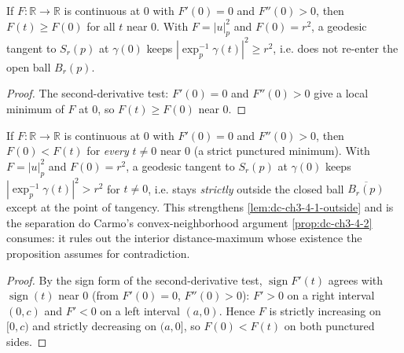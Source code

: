 \begin{lemma}
  \label{lem:dc-ch3-4-1-outside}
  \leanok
  If $F:\mathbb{R}\to\mathbb{R}$ is continuous at $0$ with $F'(0)=0$ and
  $F''(0)>0$, then $F(t)\ge F(0)$ for all $t$ near $0$. With $F=|u|_p^2$ and
  $F(0)=r^2$, a geodesic tangent to $S_r(p)$ at $\gamma(0)$ keeps
  $|\exp_p^{-1}\gamma(t)|^2\ge r^2$, i.e. does not re-enter the open ball
  $B_r(p)$.
\end{lemma}
\begin{proof}
  \leanok
  The second-derivative test: $F'(0)=0$ and $F''(0)>0$ give a local minimum of
  $F$ at $0$, so $F(t)\ge F(0)$ near $0$.
\end{proof}

\begin{lemma}
  \label{lem:dc-ch3-4-1-strict-outside}
  \leanok
  If $F:\mathbb{R}\to\mathbb{R}$ is continuous at $0$ with $F'(0)=0$ and
  $F''(0)>0$, then $F(0)<F(t)$ for \emph{every} $t\neq0$ near $0$ (a strict
  punctured minimum). With $F=|u|_p^2$ and $F(0)=r^2$, a geodesic tangent to
  $S_r(p)$ at $\gamma(0)$ keeps $|\exp_p^{-1}\gamma(t)|^2>r^2$ for $t\neq0$, i.e.
  stays \emph{strictly} outside the closed ball $\overline{B_r(p)}$ except at the
  point of tangency. This strengthens \cref{lem:dc-ch3-4-1-outside} and is the
  separation do Carmo's convex-neighborhood argument \cref{prop:dc-ch3-4-2}
  consumes: it rules out the interior distance-maximum whose existence the
  proposition assumes for contradiction.
\end{lemma}
\begin{proof}
  \leanok
  By the sign form of the second-derivative test, $\operatorname{sign} F'(t)$
  agrees with $\operatorname{sign}(t)$ near $0$ (from $F'(0)=0$, $F''(0)>0$): $F'>0$
  on a right interval $(0,c)$ and $F'<0$ on a left interval $(a,0)$. Hence $F$ is
  strictly increasing on $[0,c)$ and strictly decreasing on $(a,0]$, so $F(0)<F(t)$
  on both punctured sides.
\end{proof}

